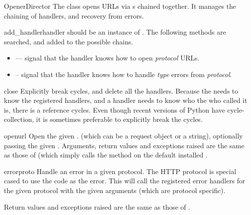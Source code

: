 \begin{classdesc}{OpenerDirector}{}
The  class opens URLs via s chained
together. It manages the chaining of handlers, and recovery from errors.
\end{classdesc}

\begin{methoddesc}[OpenerDirector]{add_handler}{handler}
 should be an instance of . The following
methods are searched, and added to the possible chains.

\begin{itemize}
	\item {} --- signal that the handler knows how
                                             to open {\em protocol} URLs.
	\item {} -- signal that the handler
                                             knows how to handle {\em type}
	                                     errors from {\em protocol}.
\end{itemize}

\end{methoddesc}

\begin{methoddesc}[OpenerDirector]{close}{}
Explicitly break cycles, and delete all the handlers.
Because the  needs to know the registered handlers,
and a handler needs to know who the  who called
it is, there is a reference cycles. Even though recent versions of Python
have cycle-collection, it is sometimes preferable to explicitly break
the cycles.
\end{methoddesc}

\begin{methoddesc}[OpenerDirector]{open}{url}
Open the given . (which can be a request object or a string),
optionally passing the given .
Arguments, return values and exceptions raised are the same as those
of  (which simply calls the  method
on the default installed .
\end{methoddesc}

\begin{methoddesc}[OpenerDirector]{error}{proto}
Handle an error in a given protocol. The HTTP protocol is special cased to
use the code as the error. This will call the registered error handlers
for the given protocol with the given arguments (which are protocol specific).

Return values and exceptions raised are the same as those
of .
\end{methoddesc}

